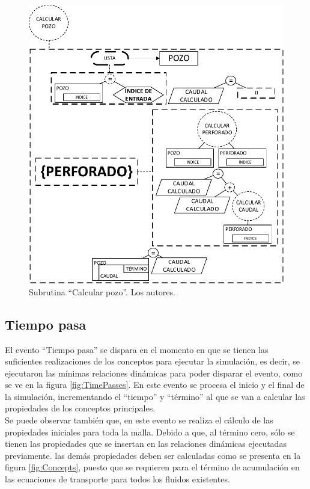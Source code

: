 \begin{figure}[h]
	\centering%
	\includegraphics[width=1\linewidth]{Fig/CalcularPozo.pdf}%
	\caption[Subrutina ``Calcular pozo''.]{Subrutina ``Calcular pozo''. Los autores.}
	\label{fig:CalculateFlow}
\end{figure}

\subsection{Tiempo pasa}\label{sec:PS_TimePasses}
El evento ``Tiempo pasa'' se dispara en el momento en que se tienen las suficientes realizaciones de los conceptos para ejecutar la simulación, es decir, se ejecutaron las mínimas relaciones dinámicas para poder disparar el evento, como se ve en la figura \ref{fig:TimePasses}. En este evento se procesa el inicio y el final de la simulación, incrementando el ``tiempo'' y ``término'' al que se van a calcular las propiedades de los conceptos principales.\\

Se puede observar también que, en este evento se realiza el cálculo de las propiedades iniciales para toda la malla. Debido a que, al término cero, sólo se tienen las propiedades que se insertan en las relaciones dinámicas ejecutadas previamente. las demás propiedades deben ser calculadas como se presenta en la figura \ref{fig:Concepts}, puesto que se requieren para el término de acumulación en las ecuaciones de transporte para todos los fluidos existentes.

